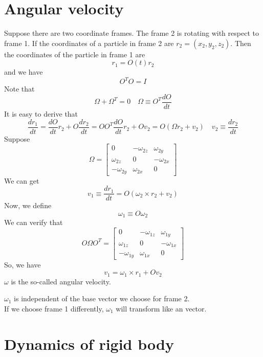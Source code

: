 \section{Angular velocity}
Suppose there are two coordinate frames. The frame 2 is rotating with respect to frame 1. If the coordinates of a particle in frame 2 are $r_2=(x_2,y_2,z_2)$.
Then the coordinates of the particle in frame 1 are
\[r_1 = O(t)r_2\]
and we have
\[O^TO=I\]
Note that
\[\Omega + \Omega^T= 0 \quad \Omega \equiv O^T\frac{dO}{dt}\]
It is easy to derive that
\[\frac{dr_1}{dt} = \frac{dO}{dt}r_2 + O\frac{dr_2}{dt} = OO^T \frac{dO}{dt}r_2 + Ov_2  = O (\Omega r_2 + v_2) \quad v_2 \equiv \frac{dr_2}{dt}\]
Suppose
\[\Omega = \left[ \begin{matrix} 0& -\omega_{2z}& \omega_{2y}\\ \omega_{2z}& 0& -\omega_{2x}\\ -\omega_{2y}& \omega_{2x}& 0\end{matrix} \right] \]
We can get
\[v_1 \equiv \frac{dr_1}{dt}  = O(\omega_2 \times r_2 + v_2) \]
Now, we define
\[\omega_1 \equiv O\omega_2\]
We can verify that
\[O \Omega O^T = \left[ \begin{matrix} 0& -\omega_{1z}& \omega_{1y}\\ \omega_{1z}& 0& -\omega_{1x}\\ -\omega_{1y}& \omega_{1x}& 0\end{matrix} \right] \]
So, we have
\[v_1 = \omega_1 \times r_1 + Ov_2\]
$\omega$ is the so-called angular velocity.
\begin{note}
$\omega_1$ is independent of the base vector we choose for frame 2.\\
If we choose frame 1 differently, $\omega_1$ will transform like an vector.
\end{note}

\section{Dynamics of rigid body}
